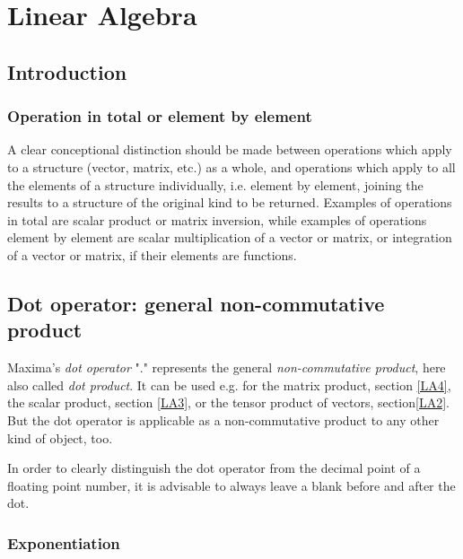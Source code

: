 \documentclass[../Maxima_Workbook.tex]{subfiles}
\begin{document}
	
\chapter{Linear Algebra}

\section{Introduction}

\subsection{Operation in total or element by element}

A clear conceptional distinction should be made between operations which apply to a structure (vector, matrix, etc.) as a whole, and operations which apply to all the elements of a structure individually, i.e. element by element, joining the results to a structure of the original kind to be returned. Examples of operations in total are scalar product or matrix inversion, while examples of operations element by element are scalar multiplication of a vector or matrix, or integration of a vector or matrix, if their elements are functions.

\section{Dot operator: general non-commutative product}\label{LA5}

\lz {} \hfill {}

\lz Maxima's \emph{dot operator} "." represents the general \emph{non-commutative product}, here also called \emph{dot product}. It can be used e.g. for the matrix product, section \ref{LA4}, the scalar product, section \ref{LA3}, or the tensor product of vectors, section\ref{LA2}. But the dot operator is applicable as a non-commutative product to any other kind of object, too.

\lz In order to clearly distinguish the dot operator from the decimal point of a floating point number, it is advisable to always leave a blank before and after the dot. 

\subsection{Exponentiation}
\end{document}
